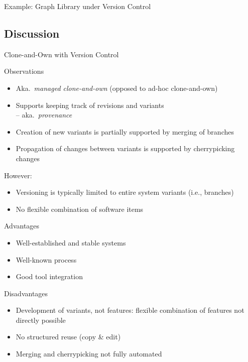 \begin{frame}{Example: Graph Library under Version Control}
	\centering{}
\end{frame}


\subsection{Discussion}

\begin{frame}{Clone-and-Own with Version Control}
	\begin{fancycolumns}[widths={60}]
		\begin{note}{Observations}
			\begin{itemize}
				\item Aka.\ \emph{managed clone-and-own} (opposed to ad-hoc clone-and-own)
				\item Supports keeping track of revisions and variants\\-- aka.\ \emph{provenance} 
				\item Creation of new variants is partially supported by merging of branches
				\item Propagation of changes between variants is supported by cherrypicking changes
			\end{itemize}
			However:
			\begin{itemize}
				\item Versioning is typically limited to entire system variants (i.e., branches)
				\item No flexible combination of software items
			\end{itemize}
		\end{note}
	\nextcolumn
		\begin{note}{Advantages}
			\begin{itemize}
				\item Well-established and stable systems
				\item Well-known process
				\item Good tool integration	
			\end{itemize}
		\end{note}
		\begin{note}{Disadvantages}
			\begin{itemize}
				\item Development of variants, not features: flexible combination of features not directly possible
				\item No structured reuse (copy \& edit)
				\item Merging and cherrypicking not fully automated
			\end{itemize}	
		\end{note}
	\end{fancycolumns}
\end{frame}

